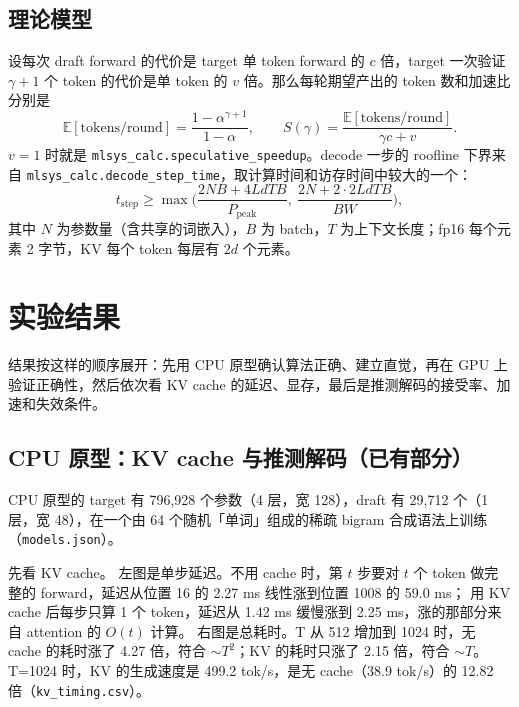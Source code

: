 \documentclass[11pt,a4paper]{ctexart}
\begin{document}
\subsection{理论模型}
设每次 draft forward 的代价是 target 单 token forward 的 $c$ 倍，target 一次验证 $\gamma{+}1$ 个 token 的代价是单 token 的 $v$ 倍。那么每轮期望产出的 token 数和加速比分别是
\begin{equation}
\mathbb{E}[\text{tokens/round}] = \frac{1-\alpha^{\gamma+1}}{1-\alpha}, \qquad
S(\gamma) = \frac{\mathbb{E}[\text{tokens/round}]}{\gamma c + v}.
\label{eq:spec}
\end{equation}
$v{=}1$ 时就是 \texttt{mlsys\_calc.speculative\_speedup}。decode 一步的 roofline 下界来自 \texttt{mlsys\_calc.decode\_step\_time}，取计算时间和访存时间中较大的一个：
\begin{equation}
t_{\text{step}} \ge \max\!\Big(\frac{2NB + 4LdTB}{P_{\text{peak}}},\ \frac{2N + 2\cdot 2LdTB}{BW}\Big),
\label{eq:roof}
\end{equation}
其中 $N$ 为参数量（含共享的词嵌入），$B$ 为 batch，$T$ 为上下文长度；fp16 每个元素 2 字节，KV 每个 token 每层有 $2d$ 个元素。

\section{实验结果}

结果按这样的顺序展开：先用 CPU 原型确认算法正确、建立直觉，再在 GPU 上验证正确性，然后依次看 KV cache 的延迟、显存，最后是推测解码的接受率、加速和失效条件。

\subsection{CPU 原型：KV cache 与推测解码（已有部分）}

CPU 原型的 target 有 796{,}928 个参数（4 层，宽 128），draft 有 29{,}712 个（1 层，宽 48），在一个由 64 个随机「单词」组成的稀疏 bigram 合成语法上训练（\texttt{models.json}）。

先看 KV cache。 左图是单步延迟。不用 cache 时，第 $t$ 步要对 $t$ 个 token 做完整的 forward，延迟从位置 16 的 2.27 ms 线性涨到位置 1008 的 59.0 ms；
用 KV cache 后每步只算 1 个 token，延迟从 1.42 ms 缓慢涨到 2.25 ms，涨的那部分来自 attention 的 $O(t)$ 计算。
右图是总耗时。T 从 512 增加到 1024 时，无 cache 的耗时涨了 4.27 倍，符合 $\sim T^2$；KV 的耗时只涨了 2.15 倍，符合 $\sim T$。
T=1024 时，KV 的生成速度是 499.2 tok/s，是无 cache（38.9 tok/s）的 12.82 倍（\texttt{kv\_timing.csv}）。
\end{document}
